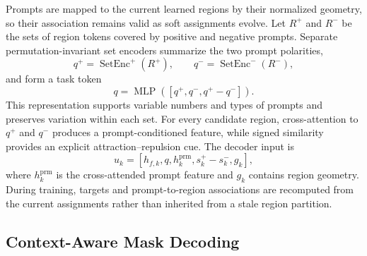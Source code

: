 \documentclass[letterpaper]{article} %
\begin{document}
Prompts are mapped to the current learned regions by their normalized geometry, so their association remains valid as soft assignments evolve. Let $R^{+}$ and $R^{-}$ be the sets of region tokens covered by positive and negative prompts. Separate permutation-invariant set encoders summarize the two prompt polarities,
\begin{equation}
    q^{+}=\operatorname{SetEnc}^{+}(R^{+}),\qquad
    q^{-}=\operatorname{SetEnc}^{-}(R^{-}),
\end{equation}
and form a task token
\begin{equation}
    q=\operatorname{MLP}([q^{+},q^{-},q^{+}-q^{-}]).
\end{equation}
This representation supports variable numbers and types of prompts and preserves variation within each set. For every candidate region, cross-attention to $q^{+}$ and $q^{-}$ produces a prompt-conditioned feature, while signed similarity provides an explicit attraction--repulsion cue. The decoder input is
\begin{equation}
    u_k=[h_{f,k},q,h_k^{\mathrm{prm}},s_k^{+}-s_k^{-},g_k],
\end{equation}
where $h_k^{\mathrm{prm}}$ is the cross-attended prompt feature and $g_k$ contains region geometry. During training, targets and prompt-to-region associations are recomputed from the current assignments rather than inherited from a stale region partition.

\subsection{Context-Aware Mask Decoding}
\end{document}
